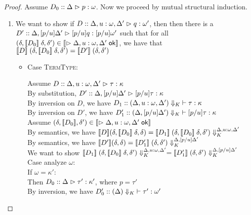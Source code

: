 \begin{proof}
  Assume $D_0 :: \judgeA{p}{\omega}$. Now we proceed by mutual structural induction.
  
  \begin{enumerate}
  \item We want to show if $D :: \judgeA[{\Delta, u:\omega, \Delta'}]{q}{\omega'}$, then
  then there is a $D' :: \judgeA[{\Delta, [p/u]\Delta'}]{[p/u]q}{[p/u]\omega'}$ such
  that for all $(\delta, \interp{D_0}\;\delta, \delta') \in 
                \interp{\judgeACtx{\Delta, u:\omega, \Delta'}}$, 
  we have that $\interp{D}\;(\delta, \interp{D_0}\;\delta, \delta') = \interp{D'}\;(\delta, \delta')$ 
  \begin{itemize}
  \item Case \textsc{TermType}: 
    \begin{tabbedproof}
      \oo Assume $D :: \judgeA[{\Delta, u:\omega, \Delta'}]{\tau}{\kappa}$ \\
      \oo By substitution, $D' :: \judgeA[{\Delta, [p/u]\Delta'}]{[p/u]\tau}{\kappa}$ \\
      \oo By inversion on $D$, we have 
          $D_1 :: \judgeWK[\restrictkind{\Delta, u:\omega, \Delta'}]{\tau}{\kappa}$ \\
      \oo By inversion on $D'$, we have 
          $D'_1 :: \judgeWK[\restrictkind{\Delta, [p/u]\Delta'}]{[p/u]\tau}{\kappa}$ \\
      \oo Assume $(\delta, \interp{D_0}, \delta') \in \interp{\judgeACtx{\Delta, u:\omega, \Delta'}}$ \\
      \oo By semantics, we have 
          $\interp{D}(\delta, \interp{D_0}\;\delta, \delta) = 
            \interp{D_1}\;\restricttyenv{\Delta, u:\omega, \Delta'}{(\delta, \interp{D_0}\;\delta, \delta')}$ \\
      \oo By semantics, we have 
          $\interp{D'}(\delta, \delta) = 
            \interp{D'_1}\;\restricttyenv{\Delta, [p/u]\Delta'}{(\delta, \delta')}$ \\
      \oo We want to show 
          $\interp{D_1}\;\restricttyenv{\Delta, u:\omega, \Delta'}{(\delta, \interp{D_0}\;\delta, \delta')} = \interp{D'_1}\;\restricttyenv{\Delta, [p/u]\Delta'}{(\delta, \delta')}$ \\
      \oo Case analyze $\omega$:\\
      \ooo If $\omega = \kappa'$:\\
      \oooo Then $D_0 :: \judgeA{\tau'}{\kappa'}$, where $p = \tau'$ \\
      \oooo By inversion, we have $D'_0 :: \judgeWK[\restrictkind{\Delta}]{\tau'}{\omega'}$ \\

\end{tabbedproof}
\end{itemize}
\end{enumerate}
\end{proof}
